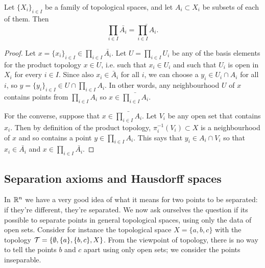 \begin{prop}
  Let $\{X_i\}_{i \in I}$ be a family of topological spaces, and let $A_i \subset X_i$ be subsets of each of them. Then
  \[
    \prod_{i \in I} \bar {A_i} = \bar{\prod_{i \in I} A_i}.
  \]
\end{prop}
\begin{proof}
  Let $x = \{x_i\}_{i \in I} \in \prod_{i \in I} \bar {A_i}$. Let $U = \prod_{i \in I} U_i$ be any of the basis elements for the product topology $x \in U$, i.e. such that $x_i \in U_i$ and such that $U_i$ is open in $X_i$ for every $i \in I$. Since also $x_i \in \bar A_i$ for all $i$, we can choose a $y_i \in U_i \cap A_i$ for all $i$, so $y = \{y_i\}_{i \in I} \in U \cap \prod_{i\in I} A_i$. In other words, any neighbourhood $U$ of $x$ contains points from $\prod_{i\in I} A_i$ so $x \in \bar{\prod_{i\in I} A_i}$.
  
  For the converse, suppose that $x \in \bar{\prod_{i\in I} A_i}$. Let $V_i$ be any open set that contains $x_i$. Then by definition of the product topology, $\pi_i^{-1}(V_i)\subset X$ is a neighbourhood of $x$ and so contains a point $y \in \prod_{i\in I} A_i$. This says that $y_i \in A_i \cap V_i$ so that $x_i \in \bar{A_i}$ and $x \in \prod_{i \in I} \bar{A_i}$.
\end{proof}

\subsection{Separation axioms and Hausdorff spaces}
In $\mathbb{R}^n$ we have a very good idea of what it means for two points to be separated: if they're different, they're separated. We now ask ourselves the question if its possible to separate points in general topological spaces, using only the data of open sets. Consider for instance the topological space $X = \{a,b,c\}$ with the topology $\mathcal{T} = \{ \emptyset, \{a\}, \{b,c\} , X\}$. From the viewpoint of topology, there is no way to tell the points $b$ and $c$ apart using only open sets; we consider the points inseparable.

